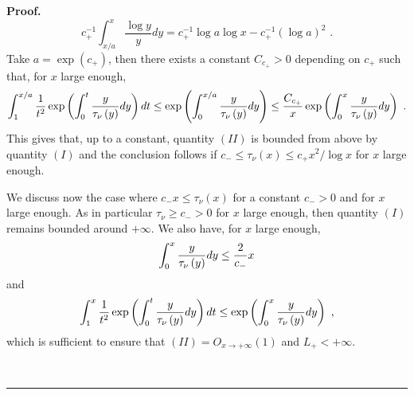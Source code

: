 \documentclass[11pt]{article}
\newenvironment{proof}[1][Proof]{\noindent\textbf{#1.} }{\ \rule{0.5em}{0.5em}}
\begin{document}
\begin{proof}
\begin{equation*}
c_{+}^{-1}\int_{x/a}^{x}\frac{\log y}{y}dy=c_{+}^{-1}\log a\log
x-c_{+}^{-1}\left( \log a\right) ^{2}\text{ .}
\end{equation*}%
Take $a=\exp \left( c_{+}\right) $, then there exists a constant $%
C_{c_{+}}>0 $ depending on $c_{+}$ such that, for $x$ large enough,%
\begin{equation*}
\int_{1}^{x/a}\frac{1}{t^{2}}\exp \left( \int_{0}^{t}\frac{y}{\mathcal{\tau }%
_{\nu }\left( y\right) }dy\right) dt\leq \exp \left( \int_{0}^{x/a}\frac{y}{%
\mathcal{\tau }_{\nu }\left( y\right) }dy\right) \leq \frac{C_{c_{+}}}{x}%
\exp \left( \int_{0}^{x}\frac{y}{\mathcal{\tau }_{\nu }\left( y\right) }%
dy\right) \text{ .}
\end{equation*}%
This gives that, up to a constant, quantity $\left( II\right) $ is bounded
from above by quantity $\left( I\right) $ and the conclusion follows if $%
c_{-}\leq \tau _{\nu }\left( x\right) \leq c_{+}x^{2}/\log x$ for $x$ large
enough.

We discuss now the case where $c_{-}x\leq \tau _{\nu }\left( x\right) $ for
a constant $c_{-}>0$ and for $x$ large enough. As in particular $\tau _{\nu
}\geq c_{-}>0$ for $x$ large enough, then quantity $(I)$ remains bounded
around $+\infty $. We also have, for $x$ large enough,%
\begin{equation*}
\int_{0}^{x}\frac{y}{\mathcal{\tau }_{\nu }\left( y\right) }dy\leq \frac{2}{%
c_{-}}x
\end{equation*}%
and%
\begin{equation*}
\int_{1}^{x}\frac{1}{t^{2}}\exp \left( \int_{0}^{t}\frac{y}{\mathcal{\tau }%
_{\nu }\left( y\right) }dy\right) dt\leq \exp \left( \int_{0}^{x}\frac{y}{%
\mathcal{\tau }_{\nu }\left( y\right) }dy\right) \text{ ,}
\end{equation*}%
which is sufficient to ensure that $\left( II\right) =O_{x\rightarrow
+\infty }\left( 1\right) $ and $L_{+}<+\infty $.


\end{proof}
\end{document}
